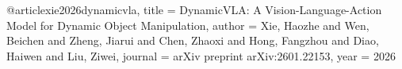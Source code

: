 @article{xie2026dynamicvla,
  title     = {DynamicVLA: A Vision-Language-Action Model for 
               Dynamic Object Manipulation},
  author    = {Xie, Haozhe and 
               Wen, Beichen and 
               Zheng, Jiarui and 
               Chen, Zhaoxi and 
               Hong, Fangzhou and 
               Diao, Haiwen and 
               Liu, Ziwei},
  journal   = {arXiv preprint arXiv:2601.22153},
  year      = {2026}
}
